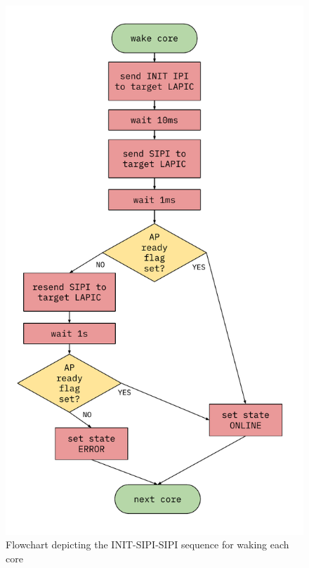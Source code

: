 \documentclass[bsc,frontabs,singlespacing,parskip,deptreport]{infthesis}
\begin{document}
\begin{figure}[h]
    \centering
    \includegraphics[scale=0.6]{figures/init-sipi-sipi.pdf}
    \caption{Flowchart depicting the INIT-SIPI-SIPI sequence for waking each core}
    \label{init-sipi-sipi}
\end{figure}
\end{document}
